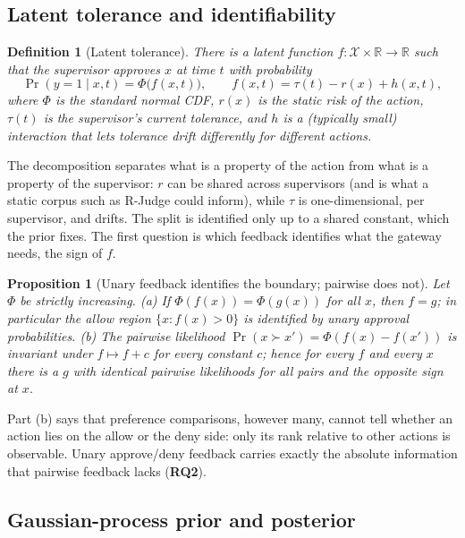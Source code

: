 \documentclass[11pt]{article}
\newtheorem{definition}{Definition}
\newtheorem{proposition}{Proposition}
\newcommand{\RQ}[1]{\textbf{RQ#1}}
\begin{document}
\subsection{Latent tolerance and identifiability}\label{sec:latent}

\begin{definition}[Latent tolerance]\label{def:latent}
There is a latent function $f\colon \mathcal{X} \times \mathbb{R} \to \mathbb{R}$
such that the supervisor approves $x$ at time $t$ with probability
\begin{equation}
    \Pr(y = 1 \mid x, t) = \Phi\bigl(f(x,t)\bigr), \qquad
    f(x, t) = \tau(t) - r(x) + h(x, t),
\end{equation}
where $\Phi$ is the standard normal CDF, $r(x)$ is the static risk of the
action, $\tau(t)$ is the supervisor's current tolerance, and $h$ is a
(typically small) interaction that lets tolerance drift differently for
different actions.
\end{definition}

The decomposition separates what is a property of the action from what is a
property of the supervisor: $r$ can be shared across supervisors (and is what
a static corpus such as R-Judge \citep{yuan-etal-2024-rjudge} could inform),
while $\tau$ is one-dimensional, per supervisor, and drifts. The split is
identified only up to a shared constant, which the prior fixes. The first
question is which feedback identifies what the gateway needs, the sign of $f$.

\begin{proposition}[Unary feedback identifies the boundary; pairwise does not]\label{prop:ident}
Let $\Phi$ be strictly increasing. (a) If $\Phi(f(x)) = \Phi(g(x))$ for all
$x$, then $f = g$; in particular the allow region $\{x : f(x) > 0\}$ is
identified by unary approval probabilities. (b) The pairwise likelihood
$\Pr(x \succ x') = \Phi(f(x) - f(x'))$ is invariant under $f \mapsto f + c$
for every constant $c$; hence for every $f$ and every $x$ there is a $g$ with
identical pairwise likelihoods for all pairs and the opposite sign at $x$.
\end{proposition}

Part (b) says that preference comparisons, however many, cannot tell whether
an action lies on the allow or the deny side: only its rank relative to other
actions is observable. Unary approve/deny feedback carries exactly the
absolute information that pairwise feedback lacks (\RQ2).

\subsection{Gaussian-process prior and posterior}\label{sec:gp}
\end{document}
